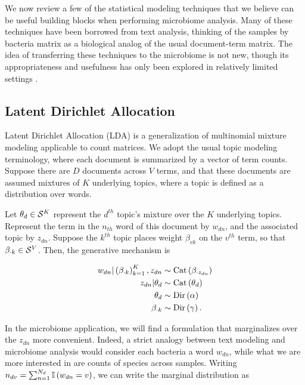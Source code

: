 \documentclass[oupdraft]{bio}
\begin{document}
We now review a few of the statistical modeling techniques that we believe can
be useful building blocks when performing microbiome analysis. Many of these
techniques have been borrowed from text analysis, thinking of the samples by
bacteria matrix as a biological analog of the usual document-term matrix. The
idea of transferring these techniques to the microbiome is not new, though its
appropriateness and usefulness has only been explored in relatively limited
settings \citep{shafiei2015biomico, chen2012estimating, holmes2012dirichlet,
  chen2013variable}.

\subsection{Latent Dirichlet Allocation}

Latent Dirichlet Allocation (LDA) is a generalization of multinomial mixture
modeling applicable to count matrices. We adopt the usual topic modeling
terminology, where each document is summarized by a vector of term counts.
Suppose there are $D$ documents across $V$ terms, and that these documents are
assumed mixtures of $K$ underlying topics, where a topic is defined as a
distribution over words.

Let $\theta_{d} \in \mathcal{S}^{K}$ represent the $d^{th}$ topic's mixture over the
$K$ underlying topics. Represent the term in the $n_{th}$ word of this document
by $w_{dn}$, and the associated topic by $z_{dn}$. Suppose the $k^{th}$ topic
places weight $\beta_{vk}$ on the $v^{th}$ term, so that $\beta_{\cdot k} \in
\mathcal{S}^{V}$. Then, the generative mechanism is

\begin{align*}
w_{dn} \vert \left(\beta_{\cdot k}\right)_{k = 1}^{K}, z_{dn} &\sim \textnormal{Cat}\left(\beta_{\cdot z_{dn}}\right) \\
z_{dn} \vert \theta_{d} &\sim \textnormal{Cat}\left(\theta_{d}\right) \\
\theta_{d} &\sim \textnormal{Dir}\left(\alpha\right) \\
\beta_{\cdot k} &\sim \textnormal{Dir}\left(\gamma\right).
\end{align*}


In the microbiome application, we will find a formulation that marginalizes over
the $z_{dn}$ more convenient. Indeed, a strict analogy between text modeling and
microbiome analysis would consider each bacteria a word $w_{dn}$, while
what we are more interested in are counts of species across samples.
Writing $n_{dv} = \sum_{n = 1}^{N_{d}} \mathbb{I}\left({w_{dn} = v}\right)$, we can write the
marginal distribution as
\end{document}
